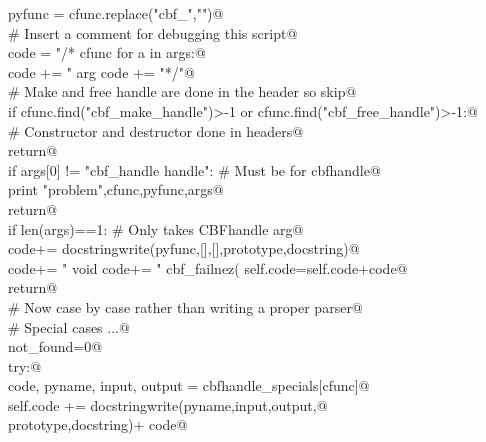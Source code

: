 \documentclass[10pt,a4paper,twoside,notitlepage]{article}
\begin{document}
\begin{flushleft}
\begin{list}{}{}
\mbox{}\verb@       pyfunc = cfunc.replace("cbf_","")@\\
\mbox{}\verb@       # Insert a comment for debugging this script@\\
\mbox{}\verb@       code = "\n/* cfunc %s   pyfunc %s  \n"%(cfunc,pyfunc)@\\
\mbox{}\verb@       for a in args:@\\
\mbox{}\verb@          code += "   arg %s "%(a)@\\
\mbox{}\verb@       code += "*/\n\n"@\\
\mbox{}\verb@       # Make and free handle are done in the header so skip@\\
\mbox{}\verb@       if cfunc.find("cbf_make_handle")>-1 or cfunc.find("cbf_free_handle")>-1:@\\
\mbox{}\verb@          # Constructor and destructor done in headers@\\
\mbox{}\verb@          return@\\
\mbox{}\verb@       if args[0] != "cbf_handle handle": # Must be for cbfhandle@\\
\mbox{}\verb@          print "problem",cfunc,pyfunc,args@\\
\mbox{}\verb@          return@\\
\mbox{}\verb@       if len(args)==1: # Only takes CBFhandle arg@\\
\mbox{}\verb@          code+= docstringwrite(pyfunc,[],[],prototype,docstring)@\\
\mbox{}\verb@          code+= "    void %s(void){\n"%(pyfunc)@\\
\mbox{}\verb@          code+= "      cbf_failnez(%s(self));}\n"%(cfunc) @\\
\mbox{}\verb@          self.code=self.code+code@\\
\mbox{}\verb@          return@\\
\mbox{}\verb@       # Now case by case rather than writing a proper parser@\\
\mbox{}\verb@       # Special cases ...@\\
\mbox{}\verb@       not_found=0@\\
\mbox{}\verb@       try:@\\
\mbox{}\verb@           code, pyname, input, output = cbfhandle_specials[cfunc]@\\
\mbox{}\verb@           self.code +=  docstringwrite(pyname,input,output,@\\
\mbox{}\verb@                                              prototype,docstring)+ code@\\

\end{list}
\end{flushleft}
\end{document}
